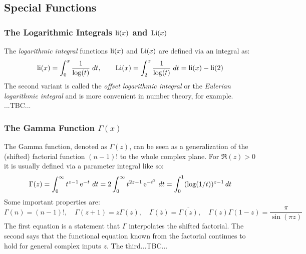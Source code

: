 




\subsection{Special Functions}

\subsubsection{The Logarithmic Integrals $\operatorname{li}(x)$ and $\operatorname{Li}(x)$}
The \emph{logarithmic integral} functions $\operatorname{li}(x)$ and $\operatorname{Li}(x)$ are defined via an integral as:
\begin{equation}
\label{Eq:LogarithmicIntegral}
 \operatorname{li}(x) = \int_{0}^{x} \frac{1}{\log(t)} \; dt, \qquad
 \operatorname{Li}(x) = \int_{2}^{x} \frac{1}{\log(t)} \; dt
        = \operatorname{li}(x) - \operatorname{li}(2)
\end{equation}
The second variant is called the \emph{offset logarithmic integral} or the \emph{Eulerian logarithmic integral} and is more convenient in number theory, for example. ...TBC...


\subsubsection{The Gamma Function $\Gamma(x)$}
The Gamma function, denoted as $\Gamma(z)$, can be seen as a generalization of the (shifted) factorial function $(n-1)!$ to the whole complex plane. For $\Re(z)>0$ it is usually defined via a parameter integral like so:
\begin{equation}
\Gamma(z) =	\int_{0}^{\infty} t^{z-1} \operatorname{\mathrm{e}}^{-t} \, dt 
          = 2 \int_{0}^{\infty} t^{2z-1} \operatorname{\mathrm{e}}^{-t^2} \, dt 
          = \int_{0}^{1} (\log(1/t))^{z-1}  \, dt 	
\end{equation}
Some important properties are:
\begin{equation}
\Gamma(n) = (n-1)!, \quad	
\Gamma(z+1) = z \Gamma(z), \quad
\Gamma(\overline{z}) = \overline{\Gamma(z)}, \quad
\Gamma(z) \Gamma(1-z) = \frac{\pi}{\sin(\pi z)}
\end{equation}
The first equation is a statement that $\Gamma$ interpolates the shifted factorial. The second says that the functional equation known from the factorial continues to hold for general complex inputs $z$. The third...TBC...


